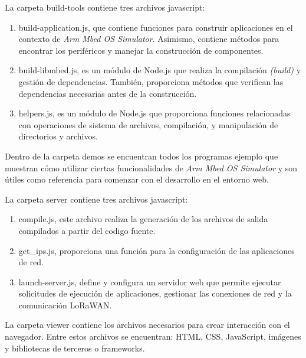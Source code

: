 \hfill \break
 
La carpeta \textquotedbl build-tools\textquotedbl{}  contiene tres archivos javascript: 

\begin{enumerate}
	\item build-application.js, que contiene funciones para construir aplicaciones en el contexto de \textit{Arm Mbed OS Simulator}. Asimismo, contiene métodos para encontrar los periféricos y manejar la construcción de componentes.
	
	\item build-libmbed.js, es un módulo de Node.js que realiza la compilación \textit{(build)} y gestión de dependencias. También, proporciona métodos que verifican las dependencias necesarias antes de la construcción.

	\item helpers.js,  es un módulo de Node.js que proporciona funciones relacionadas con operaciones de sistema de archivos, compilación, y manipulación de directorios y archivos.
\end{enumerate}
 
Dentro de la carpeta \textquotedbl demos\textquotedbl{}  se encuentran todos los programas ejemplo que muestran cómo utilizar ciertas funcionalidades de \textit{Arm Mbed OS Simulator} y son útiles como referencia para comenzar con el desarrollo en el entorno web. 
 
La carpeta \textquotedbl server\textquotedbl{}  contiene tres archivos javascript: 

\begin{enumerate}
	\item compile.js, este archivo realiza la generación de los archivos de salida compilados a partir del codigo fuente.
	
	\item get\_ips.js, proporciona una función para la configuración de las aplicaciones de red.

	\item launch-server.js, define y configura un servidor web que permite ejecutar solicitudes de ejecución de aplicaciones, gestionar las conexiones de red y la comunicación LoRaWAN.
	
\end{enumerate}
 
La carpeta \textquotedbl viewer\textquotedbl{}  contiene los archivos necesarios para crear interacción con el navegador. Entre estos archivos se encuentran: HTML, CSS, JavaScript, imágenes y bibliotecas de terceros o frameworks.
 
